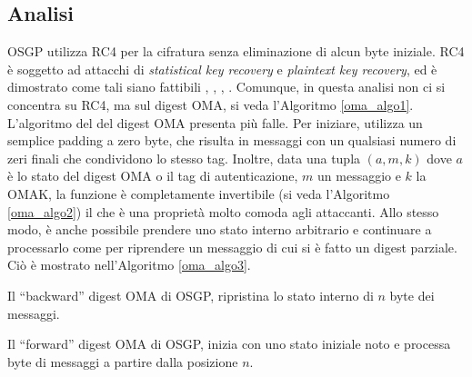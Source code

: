 \subsection{Analisi}
OSGP utilizza RC4 per la cifratura senza eliminazione di alcun byte iniziale. RC4 è soggetto ad attacchi di \textit{statistical key recovery} e \textit{plaintext key recovery}, ed è dimostrato come tali siano fattibili \cite{rc4tls}, \cite{weakrc4}, \cite{rc4rand}, \cite{rc4statistical}. Comunque, in questa analisi non ci si concentra su RC4, ma sul digest OMA, si veda l'Algoritmo \ref{oma_algo1}.\\
L'algoritmo del del digest OMA presenta più falle. Per iniziare, utilizza un semplice padding a zero byte, che risulta in messaggi con un qualsiasi numero di zeri finali che condividono lo stesso tag. Inoltre, data una tupla $(a, m, k)$ dove $a$ è lo stato del digest OMA o il tag di autenticazione, $m$ un messaggio e $k$ la OMAK, la funzione è completamente invertibile (si veda l'Algoritmo \ref{oma_algo2}) il che è una proprietà molto comoda agli attaccanti. Allo stesso modo, è anche possibile prendere uno stato interno arbitrario e continuare a processarlo come per riprendere un messaggio di cui si è fatto un digest parziale. Ciò è mostrato nell'Algoritmo \ref{oma_algo3}.
\begin{algorithm}[H]
	\caption{Il ``backward'' digest OMA di OSGP, ripristina lo stato interno di $n$ byte dei messaggi.}
	\label{oma_algo2}
\end{algorithm}
\begin{algorithm}[H]
	\caption{Il ``forward'' digest OMA di OSGP, inizia con uno stato iniziale noto e processa byte di messaggi a partire dalla posizione $n$.}
	\label{oma_algo3}
\end{algorithm}
\newpage
